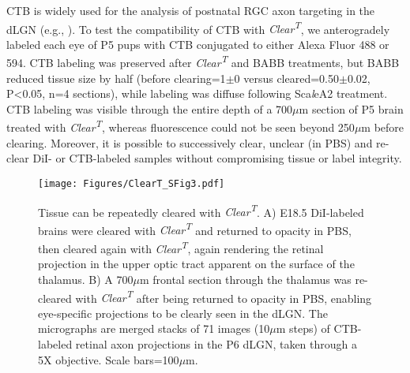 CTB is widely used for the analysis of postnatal RGC axon targeting in the dLGN (e.g., ).
To test the compatibility of CTB with \emph{Clear\textsuperscript{T}}, we anterogradely labeled each eye of P5 pups with CTB conjugated to either Alexa Fluor 488 or 594.
CTB labeling was preserved after \emph{Clear\textsuperscript{T}} and BABB treatments, but BABB reduced tissue size by half (before clearing=1$\pm$0 versus cleared=0.50$\pm$0.02, P<0.05, n=4 sections), while labeling was diffuse following Sca\emph{l}eA2 treatment. %
CTB labeling was visible through the entire depth of a 700$\mu$m section of P5 brain treated with \emph{Clear\textsuperscript{T}}, whereas fluorescence could not be seen beyond 250$\mu$m before clearing. %
Moreover, it is possible to successively clear, unclear (in PBS) and re-clear DiI- or CTB-labeled samples without compromising tissue or label integrity. %
\begin{figure}[hbtp]
    \begin{center}
        \texttt{[image: Figures/ClearT\_SFig3.pdf]}
        \caption[Tissue can be repeatedly cleared with \emph{Clear\textsuperscript{T}}.]
        {Tissue can be repeatedly cleared with \emph{Clear\textsuperscript{T}}.
        A) E18.5 DiI-labeled brains were cleared with \emph{Clear\textsuperscript{T}} and returned to opacity in PBS, then cleared again with \emph{Clear\textsuperscript{T}}, again rendering the retinal projection in the upper optic tract apparent on the surface of the thalamus.
        B) A 700$\mu$m frontal section through the thalamus was re-cleared with \emph{Clear\textsuperscript{T}} after being returned to opacity in PBS, enabling eye-specific projections to be clearly seen in the dLGN.
        The micrographs are merged stacks of 71 images (10$\mu$m steps) of CTB-labeled retinal axon projections in the P6 dLGN, taken through a 5X objective.
        Scale bars=100$\mu$m.
        }
        \label{ClearTSFig3}
    \end{center}
\end{figure}
